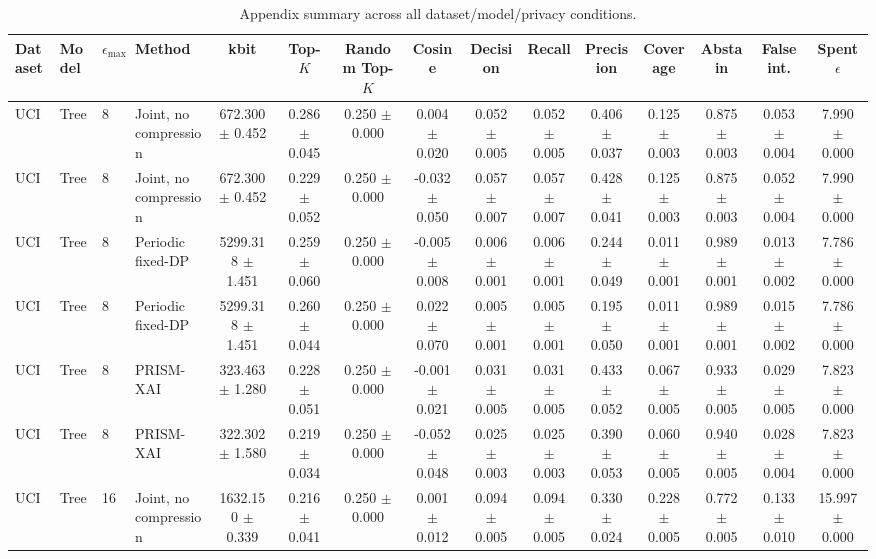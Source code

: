 \begin{table}[t]
\caption{Appendix summary across all dataset/model/privacy conditions.}
\label{tab:appendix-conditions}
\centering
\scriptsize
\setlength{\tabcolsep}{2.5pt}
\begin{tabular}{llllccccccccccc}
\toprule
Dataset & Model & $\epsilon_{\max}$ & Method & kbit & Top-$K$ & Random Top-$K$ & Cosine & Decision & Recall & Precision & Coverage & Abstain & False int. & Spent $\epsilon$ \\
\midrule
UCI & Tree & 8 & Joint, no compression & 672.300 $\pm$ 0.452 & 0.286 $\pm$ 0.045 & 0.250 $\pm$ 0.000 & 0.004 $\pm$ 0.020 & 0.052 $\pm$ 0.005 & 0.052 $\pm$ 0.005 & 0.406 $\pm$ 0.037 & 0.125 $\pm$ 0.003 & 0.875 $\pm$ 0.003 & 0.053 $\pm$ 0.004 & 7.990 $\pm$ 0.000 \\
UCI & Tree & 8 & Joint, no compression & 672.300 $\pm$ 0.452 & 0.229 $\pm$ 0.052 & 0.250 $\pm$ 0.000 & -0.032 $\pm$ 0.050 & 0.057 $\pm$ 0.007 & 0.057 $\pm$ 0.007 & 0.428 $\pm$ 0.041 & 0.125 $\pm$ 0.003 & 0.875 $\pm$ 0.003 & 0.052 $\pm$ 0.004 & 7.990 $\pm$ 0.000 \\
UCI & Tree & 8 & Periodic fixed-DP & 5299.318 $\pm$ 1.451 & 0.259 $\pm$ 0.060 & 0.250 $\pm$ 0.000 & -0.005 $\pm$ 0.008 & 0.006 $\pm$ 0.001 & 0.006 $\pm$ 0.001 & 0.244 $\pm$ 0.049 & 0.011 $\pm$ 0.001 & 0.989 $\pm$ 0.001 & 0.013 $\pm$ 0.002 & 7.786 $\pm$ 0.000 \\
UCI & Tree & 8 & Periodic fixed-DP & 5299.318 $\pm$ 1.451 & 0.260 $\pm$ 0.044 & 0.250 $\pm$ 0.000 & 0.022 $\pm$ 0.070 & 0.005 $\pm$ 0.001 & 0.005 $\pm$ 0.001 & 0.195 $\pm$ 0.050 & 0.011 $\pm$ 0.001 & 0.989 $\pm$ 0.001 & 0.015 $\pm$ 0.002 & 7.786 $\pm$ 0.000 \\
UCI & Tree & 8 & PRISM-XAI & 323.463 $\pm$ 1.280 & 0.228 $\pm$ 0.051 & 0.250 $\pm$ 0.000 & -0.001 $\pm$ 0.021 & 0.031 $\pm$ 0.005 & 0.031 $\pm$ 0.005 & 0.433 $\pm$ 0.052 & 0.067 $\pm$ 0.005 & 0.933 $\pm$ 0.005 & 0.029 $\pm$ 0.005 & 7.823 $\pm$ 0.000 \\
UCI & Tree & 8 & PRISM-XAI & 322.302 $\pm$ 1.580 & 0.219 $\pm$ 0.034 & 0.250 $\pm$ 0.000 & -0.052 $\pm$ 0.048 & 0.025 $\pm$ 0.003 & 0.025 $\pm$ 0.003 & 0.390 $\pm$ 0.053 & 0.060 $\pm$ 0.005 & 0.940 $\pm$ 0.005 & 0.028 $\pm$ 0.004 & 7.823 $\pm$ 0.000 \\
UCI & Tree & 16 & Joint, no compression & 1632.150 $\pm$ 0.339 & 0.216 $\pm$ 0.041 & 0.250 $\pm$ 0.000 & 0.001 $\pm$ 0.012 & 0.094 $\pm$ 0.005 & 0.094 $\pm$ 0.005 & 0.330 $\pm$ 0.024 & 0.228 $\pm$ 0.005 & 0.772 $\pm$ 0.005 & 0.133 $\pm$ 0.010 & 15.997 $\pm$ 0.000 \\

\end{tabular}
\end{table}
